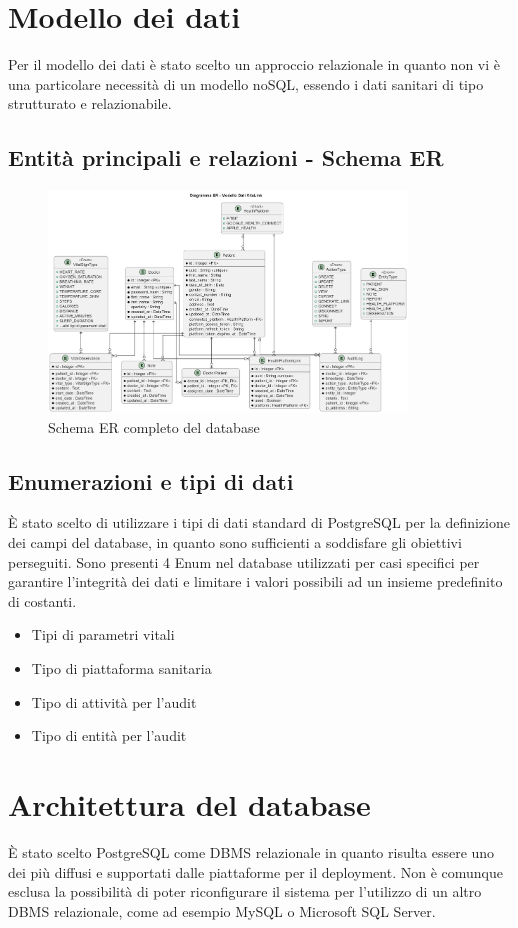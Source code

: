 \documentclass[12pt,a4paper,oneside]{report}
\begin{document}
\section{Modello dei dati}
Per il modello dei dati è stato scelto un approccio relazionale in quanto non vi è una particolare necessità di un modello noSQL, essendo i dati sanitari di tipo strutturato e relazionabile.
\subsection{Entità principali e relazioni - Schema ER}
\begin{figure}[H]
    \centering
    \includegraphics[width=0.85\textwidth]{images/DataModel.png}
    \caption{Schema ER completo del database}
    \label{fig:Schema-ER}
\end{figure}
\subsection{Enumerazioni e tipi di dati}
È stato scelto di utilizzare i tipi di dati standard di PostgreSQL per la definizione dei campi del database, in quanto sono sufficienti a soddisfare gli obiettivi perseguiti.
Sono presenti 4 Enum nel database utilizzati per casi specifici per garantire l'integrità dei dati e limitare i valori possibili ad un insieme predefinito di costanti.
\begin{itemize}
    \item Tipi di parametri vitali
    \item Tipo di piattaforma sanitaria
    \item Tipo di attività per l'audit
    \item Tipo di entità per l'audit
\end{itemize}
\section{Architettura del database}
È stato scelto PostgreSQL come DBMS relazionale in quanto risulta essere uno dei più diffusi e supportati dalle piattaforme per il deployment.
Non è comunque esclusa la possibilità di poter riconfigurare il sistema per l'utilizzo di un altro DBMS relazionale, come ad esempio MySQL o Microsoft SQL Server.
\end{document}
